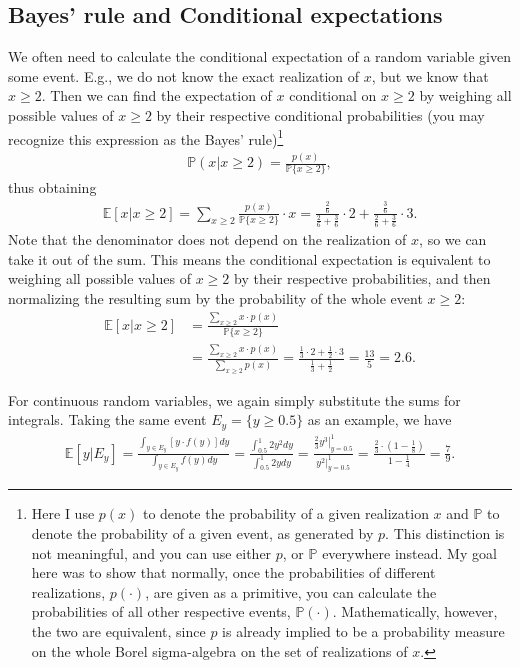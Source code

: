 \documentclass{article}
\begin{document}
\subsection{Bayes' rule and Conditional expectations}

We often need to calculate the conditional expectation of a random variable given some event. E.g., we do not know the exact realization of $x$, but we know that $x \geq 2$. Then we can find the expectation of $x$ conditional on $x \geq 2$ by weighing all possible values of $x \geq 2$ by their respective conditional probabilities (you may recognize this expression as the Bayes' rule)\footnote{
	Here I use $p(x)$ to denote the probability of a given realization $x$ and $\mathbb{P}$ to denote the probability of a given event, as generated by $p$. This distinction is not meaningful, and you can use either $p$, or $\mathbb{P}$ everywhere instead. My goal here was to show that normally, once the probabilities of different realizations, $p(\cdot)$, are given as a primitive, you can calculate the probabilities of all other respective events, $\mathbb{P}(\cdot)$. Mathematically, however, the two are equivalent, since $p$ is already implied to be a probability measure on the whole Borel sigma-algebra on the set of realizations of $x$.
}
\begin{align*}
	\mathbb{P}(x|x\geq 2) = \frac{p(x)}{\mathbb{P}\{x \geq 2\}},
\end{align*}
thus obtaining
\begin{align*}
	\mathbb{E}[x|x\geq 2] = \sum_{x\geq 2} \frac{p(x)}{\mathbb{P}\{x\geq 2\}} \cdot x
	= \frac{\frac{2}{6}}{\frac{2}{6} + \frac{3}{6}} \cdot 2 + \frac{\frac{3}{6}}{\frac{2}{6} + \frac{3}{6}} \cdot 3.
\end{align*}
Note that the denominator does not depend on the realization of $x$, so we can take it out of the sum. This means the conditional expectation is equivalent to weighing all possible values of $x \geq 2$ by their respective probabilities, and then normalizing the resulting sum by the probability of the whole event $x \geq 2$:
\begin{align*}
	\mathbb{E}[x|x\geq 2] &= \frac{\sum_{x\geq 2} x \cdot p(x)}{\mathbb{P}\{x\geq 2\}} 
	\\
	&= \frac{\sum_{x\geq 2} x \cdot p(x)}{\sum_{x\geq 2} p(x)} = \frac{\frac{1}{3}\cdot 2 + \frac{1}{2} \cdot 3}{\frac{1}{3} + \frac{1}{2}} = \frac{13}{5} = 2.6.
\end{align*}

For continuous random variables, we again simply substitute the sums for integrals. Taking the same event $E_y = \{y \geq 0.5\}$ as an example, we have
\begin{align*}
	\mathbb{E}[y|E_y] 
	= \frac{\int_{y \in E_y} \left[y \cdot f(y)\right] dy}{\int_{y \in E_y} f(y) dy} 
	= \frac{\int_{0.5}^1 2y^2 dy}{\int_{0.5}^1 2y dy} 
	= \frac{\left.\frac{2}{3} y^3\right|_{y=0.5}^1}{y^2|_{y=0.5}^1} 
	= \frac{\frac{2}{3}\cdot \left(1-\frac{1}{8}\right)}{1-\frac{1}{4}}
	= \frac{7}{9}.
\end{align*}
\end{document}
